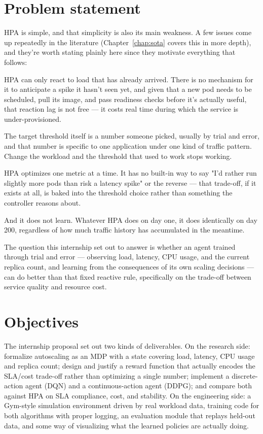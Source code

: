 \documentclass{rapportINPTCLOUD}
\begin{document}
\section{Problem statement}

HPA is simple, and that simplicity is also its main weakness. A few issues come up repeatedly in the literature (Chapter~\ref{chap:sota} covers this in more depth), and they're worth stating plainly here since they motivate everything that follows:

HPA can only react to load that has already arrived. There is no mechanism for it to anticipate a spike it hasn't seen yet, and given that a new pod needs to be scheduled, pull its image, and pass readiness checks before it's actually useful, that reaction lag is not free — it costs real time during which the service is under-provisioned.

The target threshold itself is a number someone picked, usually by trial and error, and that number is specific to one application under one kind of traffic pattern. Change the workload and the threshold that used to work stops working.

HPA optimizes one metric at a time. It has no built-in way to say "I'd rather run slightly more pods than risk a latency spike" or the reverse — that trade-off, if it exists at all, is baked into the threshold choice rather than something the controller reasons about.

And it does not learn. Whatever HPA does on day one, it does identically on day 200, regardless of how much traffic history has accumulated in the meantime.

The question this internship set out to answer is whether an agent trained through trial and error — observing load, latency, CPU usage, and the current replica count, and learning from the consequences of its own scaling decisions — can do better than that fixed reactive rule, specifically on the trade-off between service quality and resource cost.

\section{Objectives}

The internship proposal set out two kinds of deliverables. On the research side: formalize autoscaling as an MDP with a state covering load, latency, CPU usage and replica count; design and justify a reward function that actually encodes the SLA/cost trade-off rather than optimizing a single number; implement a discrete-action agent (DQN) and a continuous-action agent (DDPG); and compare both against HPA on SLA compliance, cost, and stability. On the engineering side: a Gym-style simulation environment driven by real workload data, training code for both algorithms with proper logging, an evaluation module that replays held-out data, and some way of visualizing what the learned policies are actually doing.
\end{document}
